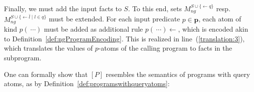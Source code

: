 \documentclass[11pt,fleqn,twoside]{article}
\renewcommand{\vec}[1]{\ensuremath{\mb{#1}}}
\newcommand{\mb}[1]{\ensuremath{\mathbf{#1}}}
\begin{document}
			Finally, we must add the input facts to $S$.
			To this end, sets $M^{S \cup \{ \leftarrow q \}}_{\mathit{ng}}$ resp.~$M^{S \cup \{ \leftarrow \bar{l} \mid l \in q \}}_{\mathit{ng}}$
			must be extended. For each input predicate $p \in \vec{p}$, each atom of kind $p(\ \cdots)$ must be added as additional rule $p(\ \cdots) \leftarrow$, which is encoded akin to Definition~\ref{def:ngProgramEncoding}.
			This is realized in line~(\ref{translation:3}), which translates the values of $p$-atoms of the calling program to facts in the subprogram.

			One can formally show that $[P]$ resembles the semantics of programs with query atoms, as by Definition~\ref{def:programswithqueryatoms}:

			
\end{document}
